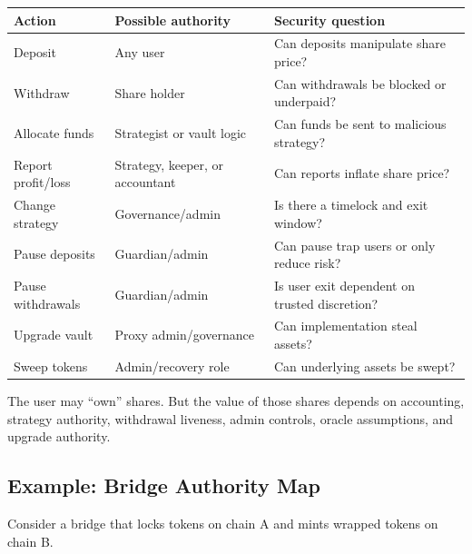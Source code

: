 {\def\LTcaptype{none} %
\begin{longtable}[]{@{}
  >{\raggedright\arraybackslash}p{}
  >{\raggedright\arraybackslash}p{}
  >{\raggedright\arraybackslash}p{}@{}}
\toprule\noalign{}
\begin{minipage}[b]{\linewidth}\raggedright
Action
\end{minipage} & \begin{minipage}[b]{\linewidth}\raggedright
Possible authority
\end{minipage} & \begin{minipage}[b]{\linewidth}\raggedright
Security question
\end{minipage} \\
\midrule\noalign{}
\endhead
\bottomrule\noalign{}
\endlastfoot
Deposit & Any user & Can deposits manipulate share price? \\
Withdraw & Share holder & Can withdrawals be blocked or underpaid? \\
Allocate funds & Strategist or vault logic & Can funds be sent to
malicious strategy? \\
Report profit/loss & Strategy, keeper, or accountant & Can reports
inflate share price? \\
Change strategy & Governance/admin & Is there a timelock and exit
window? \\
Pause deposits & Guardian/admin & Can pause trap users or only reduce
risk? \\
Pause withdrawals & Guardian/admin & Is user exit dependent on trusted
discretion? \\
Upgrade vault & Proxy admin/governance & Can implementation steal
assets? \\
Sweep tokens & Admin/recovery role & Can underlying assets be swept? \\
\end{longtable}
}

The user may ``own'' shares. But the value of those shares depends on
accounting, strategy authority, withdrawal liveness, admin controls,
oracle assumptions, and upgrade authority.

\subsection{Example: Bridge Authority Map}

Consider a bridge that locks tokens on chain A and mints wrapped tokens
on chain B.

